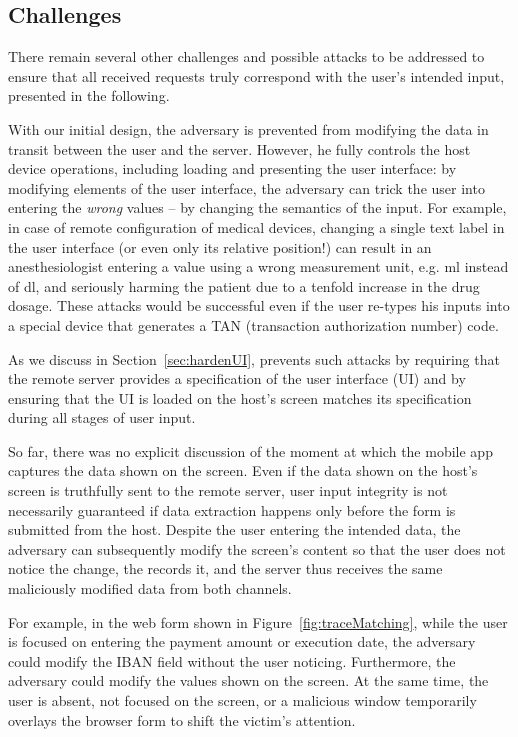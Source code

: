 \subsection{Challenges}
\label{integriscreen:sec:systemDesign:challenger}

There remain several other challenges and possible attacks to be addressed to ensure that all received requests truly correspond with the user's intended input, presented in the following.

With our initial design, the adversary is prevented from modifying the data in transit between the user and the server.
However, he fully controls the host device operations, including loading and presenting the user interface: by modifying elements of the user interface, the adversary can trick the user into entering the \textit{wrong} values -- by changing the semantics of the input.
For example, in case of remote configuration of medical devices, changing a single text label in the user interface (or even only its relative position!) can result in an anesthesiologist entering a value using a wrong measurement unit, e.g. ml instead of dl, and seriously harming the patient due to a tenfold increase in the drug dosage.
These attacks would be successful even if the user re-types his inputs into a special device that generates a TAN (transaction authorization number) code.

As we discuss in Section~\ref{sec:hardenUI}, \sysname prevents such attacks by requiring that the remote server provides a specification of the user interface (UI) and by ensuring that the UI is loaded on the host's screen matches its specification during all stages of user input.


So far, there was no explicit discussion of the moment at which the mobile app captures the data shown on the screen.
Even if the data shown on the host's screen is truthfully sent to the remote server, user input integrity is not necessarily guaranteed if data extraction happens only before the form is submitted from the host.
Despite the user entering the intended data, the adversary can subsequently modify the screen's content so that the user does not notice the change, the \app records it, and the server thus receives the same maliciously modified data from both channels.

For example, in the web form shown in Figure~\ref{fig:traceMatching}, while the user is focused on entering the payment amount or execution date, the adversary could modify the IBAN field without the user noticing.
Furthermore, the adversary could modify the values shown on the screen. At the same time, the user is absent, not focused on the screen, or a malicious window temporarily overlays the browser form to shift the victim's attention.

